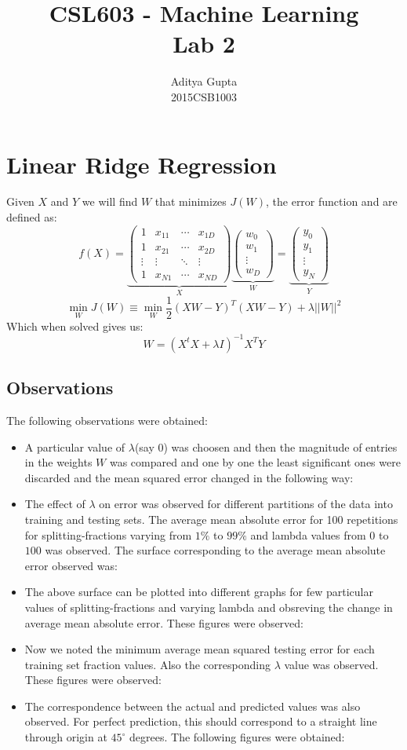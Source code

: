 \documentclass{article}
\title{CSL603 - Machine Learning\\Lab 2}
\author{Aditya Gupta\\2015CSB1003}
\begin{document}
\maketitle
\section*{Linear Ridge Regression}
Given $X$ and $Y$ we will find $W$ that minimizes $J(W)$, the error function and are defined as:
$$f(X)=
\underbrace{
\begin{pmatrix}
1&x_{11}&\cdots&x_{1D}\\
1&x_{21}&\cdots&x_{2D}\\
\vdots&\vdots&\ddots&\vdots\\
1&x_{N1}&\cdots&x_{ND}
\end{pmatrix}}_{X}
\underbrace{
\begin{pmatrix}
w_0\\w_1\\\vdots\\w_D
\end{pmatrix}}_{W}
=
\underbrace{
\begin{pmatrix}
y_0\\y_1\\\vdots\\y_N
\end{pmatrix}}_{Y}$$
$$
\min_W J(W)\equiv\min_W\frac12(XW-Y)^T(XW-Y)+\lambda||W||^2
$$
Which when solved gives us:
$$W=(X^tX+\lambda I)^{-1}X^TY$$
\subsection*{Observations}
The following observations were obtained:
\begin{itemize}
\item A particular value of $\lambda$(say $0$) was choosen and then the magnitude of entries in the weights $W$ was compared and one by one the least significant ones were discarded and the mean squared error changed in the following way:
\item The effect of $\lambda$ on error was observed for different partitions of the data into training and testing sets. The average mean absolute error for 100 repetitions for splitting-fractions varying from $1\%$ to $99\%$ and lambda values from $0$ to $100$ was observed. The surface corresponding to the average mean absolute error observed was:
\item The above surface can be plotted into different graphs for few particular values of splitting-fractions and varying lambda and obsreving the change in average mean absolute error. These figures were observed:
\item Now we noted the minimum average mean squared testing error for each training set fraction values. Also the corresponding $\lambda$ value was observed. These figures were observed:
\item The correspondence between the actual and predicted values was also observed. For perfect prediction, this should correspond to a straight line through origin at $45^\circ$ degrees. The following figures were obtained:
\end{itemize}
\end{document}
